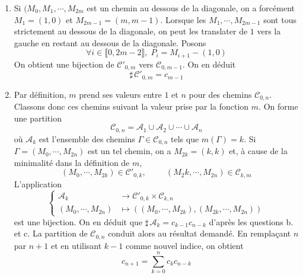 \begin{enumerate}
\begin{enumerate}
 \item Si $(M_0,M_1,\cdots,M_{2m}$ est un chemin au dessous de la diagonale, on a forcément $M_1=(1,0)$ et $M_{2m-1}=(m,m-1)$. Lorsque les $M_1,\cdots,M_{2m-1}$ sont tous strictement au dessous de la diagonale, on peut les translater de $1$ vers la gauche en restant au dessous de la diagonale. Posons
\begin{displaymath}
 \forall i\in \llbracket 0, 2m-2 \rrbracket,\;
P_i = M_{i+1} -(1,0)
\end{displaymath}
On obtient une bijection de $\mathcal{C}'_{0,m}$ vers $\mathcal{C}_{0,m-1}$. On en déduit
\begin{displaymath}
 \sharp\,\mathcal{C}'_{0,m} = c_{m-1}
\end{displaymath}
 \item Par définition, $m$ prend ses valeurs entre $1$ et $n$ pour des chemins $\mathcal{C}_{0,n}$. Classons donc ces chemins suivant la valeur prise par la fonction $m$. On forme une partition
\begin{displaymath}
 \mathcal{C}_{0,n} = \mathcal{A}_1\cup \mathcal{A}_2\cup \cdots \cup \mathcal{A}_n 
\end{displaymath}
 où $\mathcal{A}_k$ est l'ensemble des chemins $\Gamma \in\mathcal{C}_{0,n}$ tels que $m(\Gamma)=k$.\newline
Si $\Gamma=(M_0,\cdots,M_{2n})$ est un tel chemin, on a $M_{2k}=(k,k)$ et, à cause de la minimalité dans la définition de $m$,
\begin{displaymath}
 (M_0,\cdots,M_{2k})\in \mathcal{C}'_{0,k},\hspace{1cm} (M_2k,\cdots,M_{2n})\in \mathcal{C}_{k,m}
\end{displaymath}
L'application
\begin{displaymath}
 \left\lbrace 
\begin{aligned}
 \mathcal{A}_{k} &\rightarrow \mathcal{C}'_{0,k}\times \mathcal{C}_{k,n} \\
 (M_0,\cdots,M_{2n}) &\mapsto \left( (M_0,\cdots,M_{2k}) , (M_{2k},\cdots,M_{2n})\right) 
\end{aligned}
\right. 
\end{displaymath}
est une bijection. On en déduit que $\sharp\,\mathcal{A}_k=c_{k-1}c_{n-k}$ d'après les questions b. et c. La partition de $\mathcal{C}_{0,n} $ conduit alors au résultat demandé. En remplaçant $n$ par $n+1$ et en utilisant $k-1$ comme nouvel indice, on obtient
\begin{displaymath}
 c_{n+1} = \sum_{k=0}^n c_kc_{n-k}
\end{displaymath}


\end{enumerate}
\end{enumerate}
